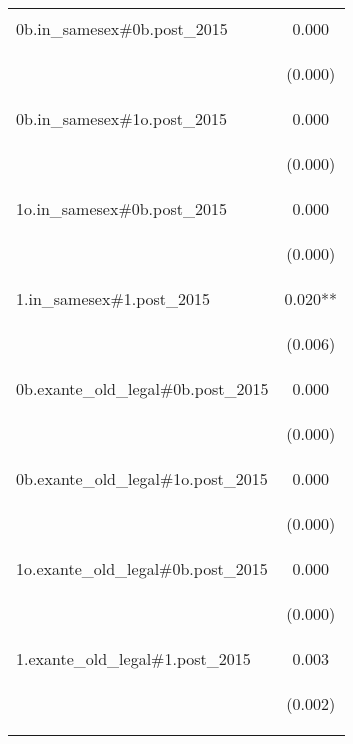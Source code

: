 \documentclass[]{article}
\begin{document}
\begin{center}
\begin{tabular}{lc}
\vspace{4pt} & \begin{footnotesize}\end{footnotesize} \\
0b.in\_samesex\#0b.post\_2015 & 0.000 \\
\vspace{4pt} & \begin{footnotesize}(0.000)\end{footnotesize} \\
0b.in\_samesex\#1o.post\_2015 & 0.000 \\
\vspace{4pt} & \begin{footnotesize}(0.000)\end{footnotesize} \\
1o.in\_samesex\#0b.post\_2015 & 0.000 \\
\vspace{4pt} & \begin{footnotesize}(0.000)\end{footnotesize} \\
1.in\_samesex\#1.post\_2015 & 0.020** \\
\vspace{4pt} & \begin{footnotesize}(0.006)\end{footnotesize} \\
0b.exante\_old\_legal\#0b.post\_2015 & 0.000 \\
\vspace{4pt} & \begin{footnotesize}(0.000)\end{footnotesize} \\
0b.exante\_old\_legal\#1o.post\_2015 & 0.000 \\
\vspace{4pt} & \begin{footnotesize}(0.000)\end{footnotesize} \\
1o.exante\_old\_legal\#0b.post\_2015 & 0.000 \\
\vspace{4pt} & \begin{footnotesize}(0.000)\end{footnotesize} \\
1.exante\_old\_legal\#1.post\_2015 & 0.003 \\
\vspace{4pt} & \begin{footnotesize}(0.002)\end{footnotesize} \\

\end{tabular}
\end{center}
\end{document}
